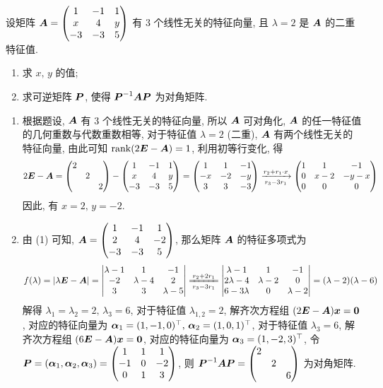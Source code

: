 \begin{example}
    设矩阵 $\vb*{A}=\mqty(1& -1& 1\\ x& 4& y\\ -3& -3& 5)$ 有 $3$ 个线性无关的特征向量, 且 $\lambda=2$ 是 $\vb*{A}$ 的二重特征值.
    \begin{enumerate}[label=(\arabic{*})]
        \item 求 $x\text{, }y$ 的值;
        \item 求可逆矩阵 $\vb*{P}$, 使得 $\vb*{P}^{-1}\vb*{AP}$ 为对角矩阵.
    \end{enumerate}
\end{example}
\begin{solution}
    \begin{enumerate}[label=(\arabic{*})]
        \item 根据题设, $\vb*{A}$ 有 3 个线性无关的特征向量, 所以 $\vb*{A}$ 可对角化, $\vb*{A}$ 的任一特征值的几何重数与代数重数相等, 对于特征值 $\lambda=2$ (二重), $\vb*{A}$
              有两个线性无关的特征向量, 由此可知 $\rank(2\vb*{E}-\vb*{A})=1$, 利用初等行变化, 得
              $$2\vb*{E}-\vb*{A}=\mqty(\dmat{2,2,2})-\mqty(1 &-1 &1\\ x &4 &y\\ -3 &-3 &5)=\mqty(1 &1 &-1\\ -x &-2 &-y\\ 3 &3 &-3)\xrightarrow[r_3-3r_1]{r_2+r_1\cdot x}\mqty(1 &1 &-1\\ 0 &x-2 &-y-x\\ 0 &0 &0)$$
              因此, 有 $x=2\text{, }y=-2.$
        \item 由 (1) 可知, $\vb*{A}=\mqty(1 &-1 &1\\ 2 &4 &-2\\ -3 &-3 &5)$, 那么矩阵 $\vb*{A}$ 的特征多项式为
              $$f(\lambda)=|\lambda\vb*{E}-\vb*{A}|=\mqty|\lambda-1 &1 &-1\\ -2 &\lambda-4 &2\\ 3 &3 &\lambda-5|\xlongequal[r_3-3r_1]{r_2+2r_1}\mqty|\lambda-1 &1 &-1\\ 2\lambda-4 &\lambda-2 &0\\ 6-3\lambda &0 &\lambda-2|=(\lambda-2)(\lambda-6)$$
              解得 $\lambda_1=\lambda_2=2\text{, }\lambda_3=6$, 对于特征值 $\lambda_{1,2}=2$, 解齐次方程组 $(2\vb*{E}-\vb*{A})\vb*{x}=\vb*{0}$, 对应的特征向量为
              $\vb*{\alpha}_1=(1,-1,0)^\top\text{, }\vb*{\alpha}_2=(1,0,1)^\top$, 
              对于特征值 $\lambda_{3}=6$, 解齐次方程组 $(6\vb*{E}-\vb*{A})\vb*{x}=\vb*{0}$, 对应的特征向量为
              $\vb*{\alpha}_3=(1,-2,3)^\top$, 
              令 $\vb*{P}=(\vb*{\alpha}_1,\vb*{\alpha}_2,\vb*{\alpha}_3)=\mqty(1 &1 &1\\ -1 &0 &-2\\ 0 &1 &3)$, 则 $\vb*{P}^{-1}\vb*{AP}=\mqty(\dmat{2,2,6})$ 为对角矩阵.
    \end{enumerate}
\end{solution}
